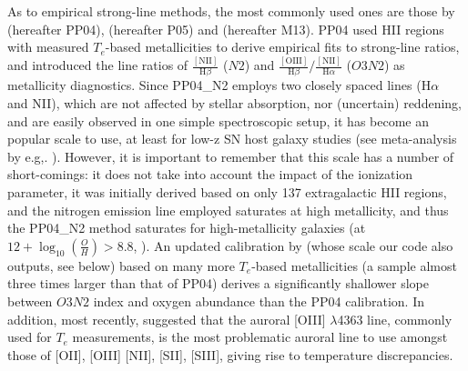 \documentclass{emulateapj}
\newcommand{\oxab}{\ensuremath{12 + \log_{10}(\frac{O}{H})}}
\newcommand{\ha}{H$\alpha$}
\begin{document}
As to empirical strong-line methods, the most commonly used ones are those by \citet{pettini04} (hereafter PP04), \citet{pilyugin05} (hereafter P05) and \citet{marino13} (hereafter M13). PP04 used HII regions with measured $T_e$-based metallicities to derive empirical fits to strong-line ratios, and introduced the line ratios of $\frac{\mathrm{[NII]}}{\mathrm{H}\beta}$ ($N2$) and $\frac{\mathrm{[OIII]}}{\mathrm{H}\beta} / \frac{\mathrm{[NII]}}{\mathrm{H}\alpha}$ ($O3N2$) as metallicity diagnostics. Since PP04\_N2 employs two closely spaced lines (\ha~ and NII), which are not affected by stellar absorption, nor (uncertain) reddening, and are easily observed in one simple spectroscopic setup, it has become an popular scale to use, at least for low-z SN host galaxy studies (see meta-analysis by e.g,. \citealt{sanders12,modjaz12_proc,leloudas14}). However, it is important to remember that this scale has a number of short-comings: it does not take into account the impact of the ionization parameter, it was initially derived based on only 137 extragalactic HII regions, and the nitrogen emission line employed saturates at high metallicity, and thus the PP04\_N2 method saturates for high-metallicity galaxies (at $\oxab > 8.8$, \citealt{kewley08}). An updated calibration by \citet{marino13} (whose scale our code also outputs, see below) based on many more $T_e$-based metallicities (a sample almost three times larger than that of PP04) derives a significantly shallower slope between $O3N2$ index and oxygen abundance than the PP04 calibration. In addition, most recently, \citet{berg15} suggested that the auroral [OIII] $\lambda$4363 line, commonly used for $T_e$ measurements, is the most problematic auroral line to use amongst those of [OII], [OIII] [NII], [SII], [SIII], giving rise to temperature discrepancies.
\end{document}
